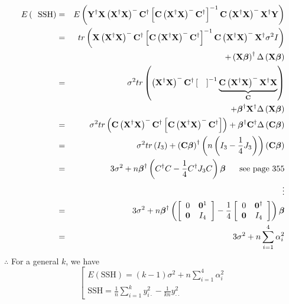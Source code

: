 \documentclass{article}
\begin{document}
\begin{eqnarray*}
E\left( \text{SSH}\right) &=&E\left( \mathbf{Y}^{\dagger }\mathbf{X}\left( 
\mathbf{X}^{\dagger }\mathbf{X}\right) ^{-}\mathbf{C}^{\dagger }\left[ 
\mathbf{C}\left( \mathbf{X}^{\dagger }\mathbf{X}\right) ^{-}\mathbf{C}%
^{\dagger }\right] ^{-1}\mathbf{C}\left( \mathbf{X}^{\dagger }\mathbf{X}%
\right) ^{-}\mathbf{X}^{\dagger }\mathbf{Y}\right) \\
&=&tr\left( \mathbf{X}\left( \mathbf{X}^{\dagger }\mathbf{X}\right) ^{-}%
\mathbf{C}^{\dagger }\left[ \mathbf{C}\left( \mathbf{X}^{\dagger }\mathbf{X}%
\right) ^{-}\mathbf{C}^{\dagger }\right] ^{-1}\mathbf{C}\left( \mathbf{X}%
^{\dagger }\mathbf{X}\right) ^{-}\mathbf{X}^{\dagger }\sigma ^{2}I\right) \\
&&+\left( \mathbf{X\beta }\right) ^{\dagger }\Delta \left( \mathbf{X\beta }%
\right) \\
&=&\sigma ^{2}tr\left( \left( \mathbf{X}^{\dagger }\mathbf{X}\right) ^{-}%
\mathbf{C}^{\dagger }\left[ \mathbf{\quad }\right] ^{-1}\underset{\mathbf{C}}%
{\underbrace{\mathbf{C}\left( \mathbf{X}^{\dagger }\mathbf{X}\right) ^{-}%
\mathbf{X}^{\dagger }\mathbf{X}}}\right) \\
&&+\mathbf{\beta }^{\dagger }\mathbf{X^{\dagger }}\Delta \left( \mathbf{%
X\beta }\right) \\
&=&\sigma ^{2}tr\left( \mathbf{C}\left( \mathbf{X}^{\dagger }\mathbf{X}%
\right) ^{-}\mathbf{C}^{\dagger }\left[ \mathbf{C}\left( \mathbf{X}^{\dagger
}\mathbf{X}\right) ^{-}\mathbf{C}^{\dagger }\right] \right) +\mathbf{\beta }%
^{\dagger }\mathbf{C^{\dagger }}\Delta \left( \mathbf{C\beta }\right) \\
&=&\sigma ^{2}tr\left( I_{3}\right) +\left( \mathbf{C\beta }\right)
^{\dagger }\left( n\left( I_{3}-\frac{1}{4}J_{3}\right) \right) \left( 
\mathbf{C\beta }\right) \\
&=&3\sigma ^{2}+n\mathbf{\beta }^{\dagger }\left( C^{\dagger }C-\frac{1}{4}%
C^{\dagger }J_{3}C\right) \mathbf{\beta \quad }\text{see page 355} \\
&&\vdots \\
&=&3\sigma ^{2}+n\mathbf{\beta }^{\dagger }\left( \left[ 
\begin{array}{cc}
0 & \mathbf{0}^{1} \\ 
\mathbf{0} & I_{4}%
\end{array}%
\right] -\frac{1}{4}\left[ 
\begin{array}{cc}
0 & \mathbf{0}^{\dagger } \\ 
\mathbf{0} & I_{4}%
\end{array}%
\right] \right) \mathbf{\beta } \\
&=&3\sigma ^{2}+n\sum\limits_{i=1}^{4}\alpha _{i}^{2}
\end{eqnarray*}%
$\therefore $ For a general $k$, we have%
\begin{equation*}
\left[ 
\begin{array}{c}
E\left( \text{SSH}\right) =\left( k-1\right) \sigma
^{2}+n\sum\limits_{i=1}^{4}\alpha _{i}^{2} \\ 
\text{SSH}=\frac{1}{n}\sum\limits_{i=1}^{k}y_{i\cdot }^{2}-\frac{1}{kn}%
y_{\cdot \cdot }^{2}%
\end{array}%
\right.
\end{equation*}
\end{document}
